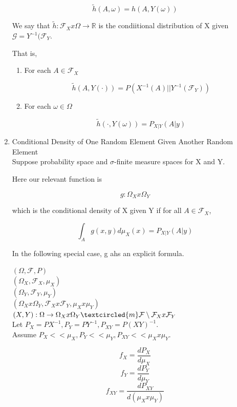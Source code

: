 \documentclass[11pt,fleqn]{book} %
\begin{document}
\begin{enumerate}
				$$\tilde{h}(A, \omega) = h(A, Y(\omega)) $$

		We say that $\tilde{h}: \mathcal{F}_X x \Omega \rightarrow \mathbb{R}$ is the condiitional distribution of X given $\mathcal{G} = Y^{-1}(\mathcal{F}_Y$. 

		That is, 

				\begin{enumerate}
				 	\item For each $A \in \mathcal{F}_X$

				 			$$\tilde{h}(A, Y(\cdot)) = P(X^{-1}(A) || Y^{-1}(\mathcal{F}_Y)) $$
		 			\item  For each $\omega \in \Omega$

		 					$$\tilde{h}(\cdot, Y(\omega)) = P_{X|Y}(A | y) $$
				 \end{enumerate} 


	\item Conditional Density of One Random Element Given Another Random Element\\

		Suppose probability space and $\sigma$-finite measure spaces for X and Y. 

		Here our relevant function is

				$$g: \Omega_X x \Omega_Y $$

		which is the conditional density of X given Y if for all $A \in \mathcal{F}_X$, 

				$$\int_A g(x, y) d \mu_X(x) = P_{X|Y}(A|y) $$

		In the following special case, g ahs an explicit formula. 


		$(\Omega, \mathcal{F}, P)$\\
		$(\Omega_X, \mathcal{F}_X, \mu_X)$\\
		$(\Omega_Y, \mathcal{F}_Y, \mu_Y)$\\
		$(\Omega_X x \Omega_Y, \mathcal{F}_X x \mathcal{F}_Y, \mu_X x \mu_Y)$\\
		$(X, Y): \Omega \rightarrow \Omega_X x \Omega_Y \textcircled{m} \mathcal{F}\setminus \mathcal{F}_X x \mathcal{F}_Y$\\

		Let $P_X = P X^{-1}, P_Y = P Y^{-1}, P_{XY} = P (XY)^{-1}$. \\
		Assume $P_X << \mu_X, P_Y << \mu_Y, P_{XY} << \mu_X x \mu_Y$. 



				$$f_X = \frac{dP_X}{d\mu_X} $$
				$$f_Y = \frac{dP_Y}{d\mu_Y} $$ 
				$$f_{XY} = \frac{dP_{XY}}{d(\mu_X x \mu_Y) } $$ 


\end{enumerate}
\end{document}
